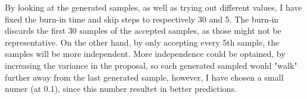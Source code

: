 \documentclass{report}
\begin{document}
By looking at the generated samples, as well as trying out different values, I have fixed the burn-in time and skip steps to respectively 30 and 5. The burn-in discards the first 30 samples of the accepted samples, as those might not be representative. On the other hand, by only accepting every 5th sample, the samples will be more independent. More independence could be optained, by increasing the variance in the proposal, so each generated sampled would "walk" further away from the last generated sample, however, I have chosen a small numer (at 0.1), since this number resultet in better predictions.
\end{document}
